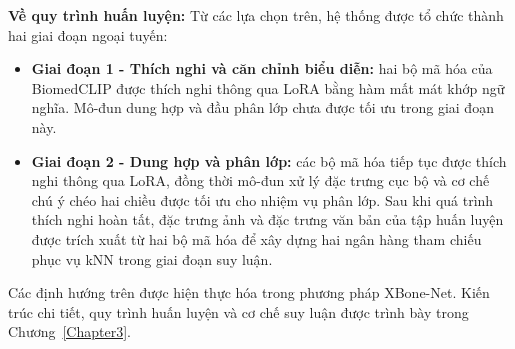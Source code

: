 \pagebreak
\textbf{Về quy trình huấn luyện:}
Từ các lựa chọn trên, hệ thống được tổ chức thành hai giai đoạn ngoại tuyến:

\begin{itemize}
    \item \textbf{Giai đoạn 1 - Thích nghi và căn chỉnh biểu diễn:}
    hai bộ mã hóa của BiomedCLIP được thích nghi thông qua LoRA bằng hàm mất mát khớp ngữ nghĩa. Mô-đun dung hợp và đầu phân lớp chưa được tối ưu trong giai đoạn này.

    \item \textbf{Giai đoạn 2 - Dung hợp và phân lớp:}
    các bộ mã hóa tiếp tục được thích nghi thông qua LoRA, đồng thời mô-đun xử lý đặc trưng cục bộ và cơ chế chú ý chéo hai chiều được tối ưu cho nhiệm vụ phân lớp. Sau khi quá trình thích nghi hoàn tất, đặc trưng ảnh và đặc trưng văn bản của tập huấn luyện được trích xuất từ hai bộ mã hóa để xây dựng hai ngân hàng tham chiếu phục vụ kNN trong giai đoạn suy luận.
\end{itemize}

Các định hướng trên được hiện thực hóa trong phương pháp XBone-Net. Kiến trúc chi tiết, quy trình huấn luyện và cơ chế suy luận được trình bày trong Chương~\ref{Chapter3}.

